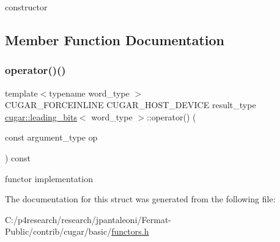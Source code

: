constructor 

\subsection{Member Function Documentation}
\mbox{\label{structcugar_1_1leading__bits_aac537b0be4fe5120f9db93f46a22c057}} 
\subsubsection{\texorpdfstring{operator()()}{operator()()}}
{\footnotesize\ttfamily template$<$typename word\+\_\+type $>$ \\
C\+U\+G\+A\+R\+\_\+\+F\+O\+R\+C\+E\+I\+N\+L\+I\+NE C\+U\+G\+A\+R\+\_\+\+H\+O\+S\+T\+\_\+\+D\+E\+V\+I\+CE result\+\_\+type \hyperlink{structcugar_1_1leading__bits}{cugar\+::leading\+\_\+bits}$<$ word\+\_\+type $>$\+::operator() (\begin{DoxyParamCaption}\item[{const argument\+\_\+type}]{op }\end{DoxyParamCaption}) const\hspace{0.3cm}{\ttfamily [inline]}}

functor implementation 

The documentation for this struct was generated from the following file\+:\begin{DoxyCompactItemize}
\item 
C\+:/p4research/research/jpantaleoni/\+Fermat-\/\+Public/contrib/cugar/basic/\hyperlink{functors_8h}{functors.\+h}\end{DoxyCompactItemize}
